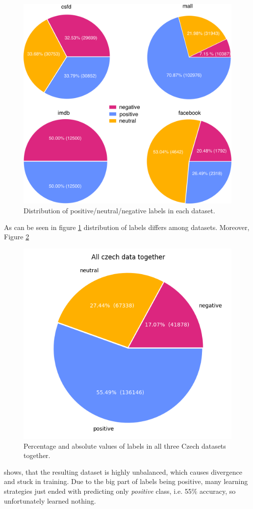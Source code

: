 \begin{figure}[!ht]
\centering
\includegraphics[width=1\columnwidth]{../img/dist_all.png}
\protect\caption{Distribution of positive/neutral/negative labels in each dataset.}
\label{pic:dist}
\end{figure}

As can be seen in figure \ref{pic:dist}
distribution of labels differs among datasets. Moreover, Figure \ref{pic:dist_all}
\begin{figure}[!ht]
\centering
\includegraphics[width=0.7\columnwidth]{../img/all.png}
\protect\caption{Percentage and absolute values of labels in all three Czech datasets together.}
\label{pic:dist_all}
\end{figure}
shows, that the resulting dataset is highly unbalanced, which causes divergence and stuck in training. Due to the big part of labels being positive, many learning strategies just ended with predicting only \textit{positive} class, i.e. 55\% accuracy, so unfortunately learned nothing. 

